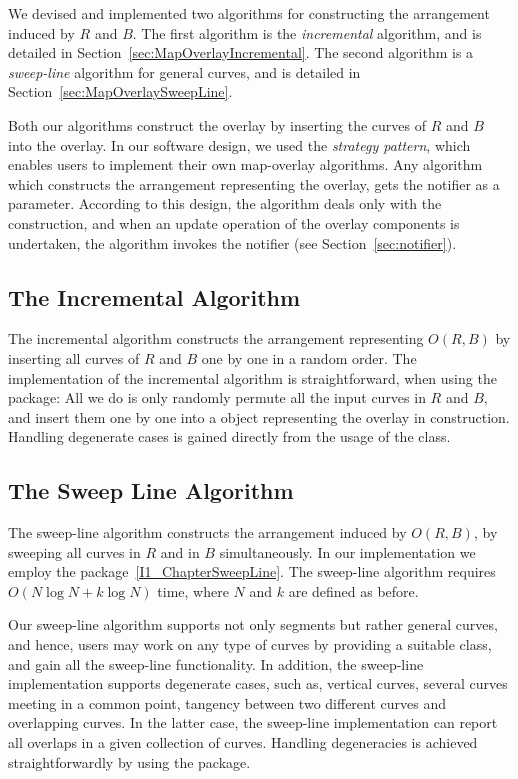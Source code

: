 \begin{ccTexOnly}
We devised and implemented two algorithms for constructing the 
arrangement induced by $R$ and $B$.
The first algorithm is the {\em incremental} algorithm, and is detailed in Section~\ref{sec:MapOverlayIncremental}. 
The second algorithm is a {\em sweep-line} algorithm 
for general curves, and is detailed in 
Section~\ref{sec:MapOverlaySweepLine}.

Both our algorithms construct the overlay by inserting 
the curves of $R$ and $B$ into the overlay.
In our software design, we used the {\it strategy pattern}, 
which enables users to implement their own map-overlay algorithms.
Any algorithm which constructs the arrangement representing 
the overlay, gets the notifier as a parameter. 
According to this design, the algorithm deals only with the construction, 
and when an update operation of the overlay components is undertaken, 
the algorithm invokes the notifier (see Section~\ref{sec:notifier}). 

\subsection*{The Incremental Algorithm}
\label{sec:MapOverlayIncremental}
The incremental algorithm constructs the arrangement representing 
$O(R,B)$ by inserting all curves of $R$ and $B$ one by one in a 
random order. 
The implementation of the incremental algorithm is straightforward, 
when using the  package: All we 
do is only randomly permute all the input curves in $R$ and $B$, 
and insert them one by one into a 
 object representing the 
overlay in construction.
Handling degenerate cases is gained directly from the usage of the 
 class.

\subsection*{The Sweep Line Algorithm}
\label{sec:MapOverlaySweepLine}
The sweep-line algorithm constructs the arrangement induced by $O(R,B)$, 
by sweeping all curves in $R$ and in $B$ simultaneously. 
In our implementation we employ the  
package~\ref{I1_ChapterSweepLine}. 
The sweep-line algorithm requires $O(N\log{N} + k\log{N})$ time,
where $N$ and $k$ are defined as before.

Our sweep-line algorithm supports not only segments but rather 
general curves, and hence, users may work on any type of curves by 
providing a suitable  class, and 
gain all the sweep-line functionality.
In addition, the sweep-line implementation supports degenerate cases, 
such as, vertical curves, several curves meeting in a common point, 
tangency between two different curves and overlapping curves.
In the latter case, the sweep-line implementation can report all overlaps
in a given collection of curves.
Handling degeneracies is achieved straightforwardly by using the 
 package.


\end{ccTexOnly}
